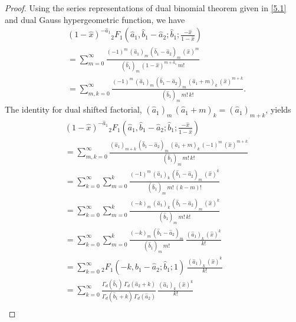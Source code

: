 \documentclass[11pt,a4paper,fleqn]{article}
\numberwithin{equation}{section}
\numberwithin{lemma}{section}
\numberwithin{theorem}{section}
\numberwithin{corollary}{section}
\begin{document}
\begin{proof}
	Using the series representations of dual binomial theorem given in \eqref{5.1} and dual Gauss hypergeometric function, we have
\begin{align}
&	(1 - \widehat{x})^{-\widehat{a}_1} {}_2F_1 \left(\widehat{a}_1, \widehat{b}_1 - \widehat{a}_2; \widehat{b}_1; \frac{-\widehat{x}}{1 - \widehat{x}}\right)\nonumber\\
 & = \sum_{m = 0}^{\infty} \frac{(-1)^m \, (\widehat{a}_1)_m \, (\widehat{b}_1 - \widehat{a}_2)_m \, (\widehat{x})^m}{(\widehat{b}_1)_m \, (1 - \widehat{x})^{m + \widehat{a}_1} \, m !}\nonumber\\
	& = \sum_{m, k = 0}^{\infty} \frac{(-1)^m \, (\widehat{a}_1)_m \, (\widehat{b}_1 - \widehat{a}_2)_m \, (\widehat{a}_1 + m)_k \, (\widehat{x})^{m + k} }{(\widehat{b}_1)_m  \, m ! \, k !}.
\end{align}
The identity for dual shifted factorial, $(\widehat{a}_1)_m \, (\widehat{a}_1 + m)_k = (\widehat{a}_1)_{m + k}$, yields
\begin{align}
&	(1 - \widehat{x})^{-\widehat{a}_1} {}_2F_1 \left(\widehat{a}_1, \widehat{b}_1 - \widehat{a}_2; \widehat{b}_1; \frac{-\widehat{x}}{1 - \widehat{x}}\right)\nonumber\\
 & =  \sum_{m, k = 0}^{\infty} \frac{ (\widehat{a}_1)_{m + k} \, (\widehat{b}_1 - \widehat{a}_2)_m \, (\widehat{a}_1 + m)_k \, (-1)^m \, (\widehat{x})^{m + k} }{(\widehat{b}_1)_m  \, m ! \, k !}\nonumber\\
	& = \sum_{k = 0}^{\infty} \sum_{m = 0}^{k} \frac{(-1)^m \, (\widehat{a}_1)_k \, (\widehat{b}_1 - \widehat{a}_2)_m \, (\widehat{x})^k}{(\widehat{b}_1)_m \, m ! \, (k - m)!}\nonumber\\
	& = \sum_{k = 0}^{\infty} \sum_{m = 0}^{k} \frac{(-k)_m \, (\widehat{a}_1)_k \, (\widehat{b}_1 - \widehat{a}_2)_m \, (\widehat{x})^k}{(\widehat{b}_1)_m \, m ! \, k!}\nonumber\\
	& = \sum_{k = 0}^{\infty} \sum_{m = 0}^{k} \frac{(-k)_m \,  (\widehat{b}_1 - \widehat{a}_2)_m}{(\widehat{b}_1)_m \, m ! } \, \frac{(\widehat{a}_1)_k \, (\widehat{x})^k}{k!}\nonumber\\
	& = \sum_{k = 0}^{\infty} {}_2F_1 (-k, \widehat{b}_1 - \widehat{a}_2; \widehat{b}_1; 1) \, \frac{(\widehat{a}_1)_k \, (\widehat{x})^k}{k!}\nonumber\\
	& = \sum_{k = 0}^{\infty} \frac{\Gamma_d (\widehat{b}_1) \, \Gamma_d (\widehat{a}_2 + k)}{\Gamma_d (\widehat{b}_1 + k) \, \Gamma_d (\widehat{a}_2)} \, \frac{(\widehat{a}_1)_k \, (\widehat{x})^k}{k!}\nonumber\\

\end{align}
\end{proof}
\end{document}
